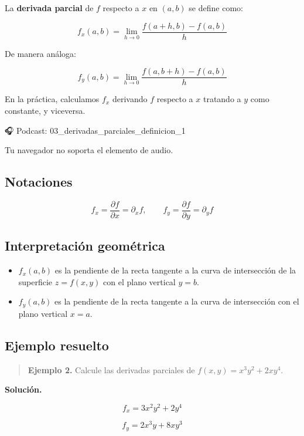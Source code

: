 \documentclass[
]{book}
\providecommand{\tightlist}{%
  \setlength{\itemsep}{0pt}\setlength{\parskip}{0pt}}
\begin{document}
La \textbf{derivada parcial} de \(f\) respecto a \(x\) en \((a, b)\) se define como:

\[
f_x(a, b) = \lim_{h \to 0} \frac{f(a + h, b) - f(a, b)}{h}
\]

De manera análoga:

\[
f_y(a, b) = \lim_{h \to 0} \frac{f(a, b + h) - f(a, b)}{h}
\]

En la práctica, calculamos \(f_x\) derivando \(f\) respecto a \(x\) tratando a \(y\) como constante, y viceversa.

🎧 Podcast: 03\_derivadas\_parciales\_definicion\_1

Tu navegador no soporta el elemento de audio.

\subsection{Notaciones}\label{notaciones}

\[
f_x = \frac{\partial f}{\partial x} = \partial_x f, \qquad
f_y = \frac{\partial f}{\partial y} = \partial_y f
\]

\subsection{Interpretación geométrica}\label{interpretaciuxf3n-geomuxe9trica-1}

\begin{itemize}
\tightlist
\item
  \(f_x(a, b)\) es la pendiente de la recta tangente a la curva de intersección de la superficie \(z = f(x, y)\) con el plano vertical \(y = b\).
\item
  \(f_y(a, b)\) es la pendiente de la recta tangente a la curva de intersección con el plano vertical \(x = a\).
\end{itemize}

\subsection{Ejemplo resuelto}\label{ejemplo-resuelto-9}

\begin{quote}
\textbf{Ejemplo 2.} Calcule las derivadas parciales de \(f(x, y) = x^3 y^2 + 2xy^4\).
\end{quote}

\textbf{Solución.}

\[
f_x = 3x^2 y^2 + 2y^4
\]

\[
f_y = 2x^3 y + 8xy^3
\]
\end{document}

